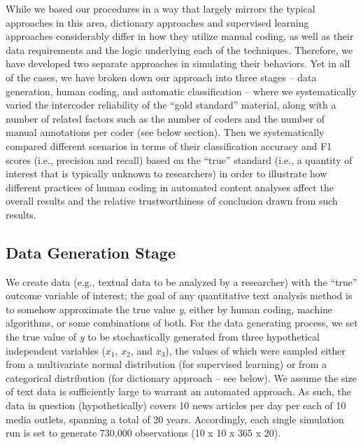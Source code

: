 \documentclass[man, floatsintext, 12pt, a4paper, noextraspace]{apa6}
\begin{document}
    While we based our procedures in a way that largely mirrors the typical approaches in this area, dictionary approaches and supervised learning approaches considerably differ in how they utilize manual coding, as well as their data requirements and the logic underlying each of the techniques. Therefore, we have developed two separate approaches in simulating their behaviors. Yet in all of the cases, we have broken down our approach into three stages – data generation, human coding, and automatic classification – where we systematically varied the intercoder reliability of the “gold standard” material, along with a number of related factors such as the number of coders and the number of manual annotations per coder (see below section). Then we systematically compared different scenarios in terms of their classification accuracy and F1 scores (i.e., precision and recall) based on the \enquote{true} standard (i.e., a quantity of interest that is typically unknown to researchers) in order to illustrate how different practices of human coding in automated content analyses affect the overall results and the relative trustworthiness of conclusion drawn from such results.
    
    \subsection{Data Generation Stage}
    
    We create data (e.g., textual data to be analyzed by a researcher) with the \enquote{true} outcome variable of interest; the goal of any quantitative text analysis method is to somehow approximate the true value \textit{y}, either by human coding, machine algorithms, or some combinations of both. For the data generating process, we set the true value of \textit{y} to be stochastically generated from three hypothetical independent variables ($x_1$, $x_2$, and $x_3$), the values of which were sampled either from a multivariate normal distribution (for supervised learning) or from a categorical distribution (for dictionary approach -- see below). We assume the size of text data is sufficiently large to warrant an automated approach. As such, the data in question (hypothetically) covers 10 news articles per day per each of 10 media outlets, spanning a total of 20 years. Accordingly, each single simulation run is set to generate 730,000 observations (10 x 10 x 365 x 20).
    
\end{document}
